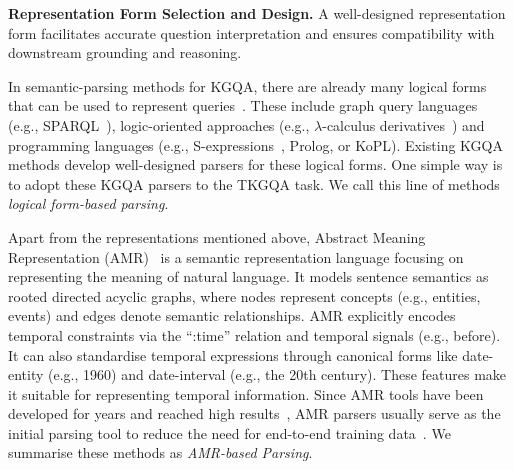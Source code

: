 {\textbf{Representation Form Selection and Design.} A well-designed representation form facilitates accurate question interpretation and ensures compatibility with downstream grounding and reasoning.

In semantic-parsing methods for KGQA, there are already many logical forms that can be used to represent queries~\cite{kamathSurveySemanticParsing2019}. These include graph query languages (e.g., SPARQL~\cite{borrotoSPARQLQAv2SystemKnowledge2023}),  logic-oriented approaches (e.g., $\lambda$-calculus derivatives~\cite{caiLargescaleSemanticParsing2013}) and programming languages (e.g., S-expressions~\cite{guThreeLevelsGeneralization2021}, Prolog, or KoPL). Existing KGQA methods develop well-designed parsers for these logical forms. One simple way is to adopt these KGQA parsers to the TKGQA task. We call this line of methods \textit{logical form-based parsing}.

Apart from the representations mentioned above, Abstract Meaning Representation (AMR)~\cite{banarescuAbstractMeaningRepresentation2013} is a semantic representation language focusing on representing the meaning of natural language. It models sentence semantics as rooted directed acyclic graphs, where nodes represent concepts (e.g., entities, events) and edges denote semantic relationships. AMR explicitly encodes temporal constraints via the ``:time'' relation and temporal signals (e.g., before). It can also standardise temporal expressions through canonical forms like date-entity (e.g., 1960) and date-interval (e.g., the 20th century). These features make it suitable for representing temporal information. Since AMR tools have been developed for years and reached high results~\cite{bevilacquaRecentTrendsWord2021}, AMR parsers usually serve as the initial parsing tool to reduce the need for end-to-end training data~\cite{kapanipathiLeveragingAbstractMeaning2020}. We summarise these methods as \textit{AMR-based Parsing}.

}
